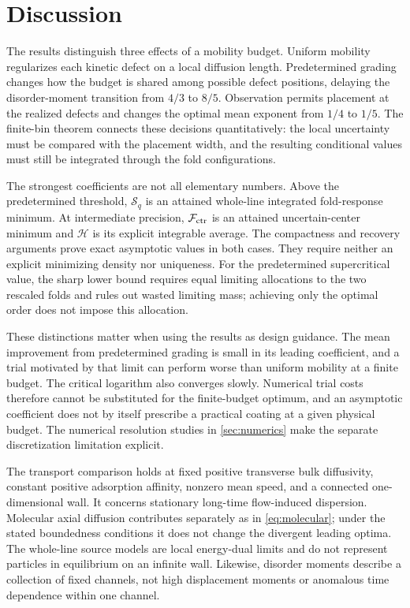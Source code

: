 \section{Discussion}
\label{sec:discussion}
The results distinguish three effects of a mobility budget. Uniform
mobility regularizes each kinetic defect on a local diffusion length.
Predetermined grading changes how the budget is shared among possible
defect positions, delaying the disorder-moment transition from $4/3$
to $8/5$. Observation permits placement at the realized defects and
changes the optimal mean exponent from $1/4$ to $1/5$. The finite-bin
theorem connects these decisions quantitatively: the local uncertainty
must be compared with the placement width, and the resulting conditional
values must still be integrated through the fold configurations.

The strongest coefficients are not all elementary numbers. Above the
predetermined threshold, $\mathcal S_q$ is an attained whole-line
integrated fold-response minimum. At intermediate precision,
$\mathcal F_{\rm ctr}$ is an attained uncertain-center minimum and
$\mathcal H$ is its explicit integrable average. The compactness and
recovery arguments prove exact asymptotic values in both cases.
They require neither an explicit minimizing density nor uniqueness.
For the predetermined supercritical value, the sharp lower bound
requires equal limiting allocations to the two rescaled folds and
rules out wasted limiting mass; achieving only the optimal order
does not impose this allocation.

These distinctions matter when using the results as design guidance.
The mean improvement from predetermined grading is small in its leading
coefficient, and a trial motivated by that limit can perform worse than
uniform mobility at a finite budget. The critical logarithm also
converges slowly. Numerical trial costs therefore cannot be substituted
for the finite-budget optimum, and an asymptotic coefficient does not
by itself prescribe a practical coating at a given physical budget.
The numerical resolution studies in \cref{sec:numerics} make the
separate discretization limitation explicit.

The transport comparison holds at fixed positive transverse bulk
diffusivity, constant positive adsorption affinity, nonzero mean speed,
and a connected one-dimensional wall. It concerns stationary long-time
flow-induced dispersion. Molecular axial diffusion contributes
separately as in \eqref{eq:molecular}; under the stated boundedness
conditions it does not change the divergent leading optima.
The whole-line source models are local energy-dual limits and do not
represent particles in equilibrium on an infinite wall. Likewise,
disorder moments describe a collection of fixed channels, not high
displacement moments or anomalous time dependence within one channel.

